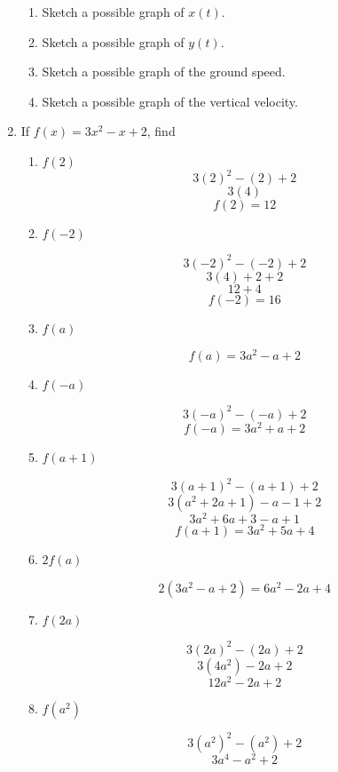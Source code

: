\documentclass{article}
\begin{document}
\begin{enumerate}
			\begin{enumerate}
				\item Sketch a possible graph of $x(t)$.
				
				\item Sketch a possible graph of $y(t)$.
				
				\item Sketch a possible graph of the ground speed.
				
				\item Sketch a possible graph of the vertical velocity.
			\end{enumerate}
			
		\item If $f(x) = 3x^2 - x + 2$, find 
			\begin{enumerate}
				\item $f(2)$
					$$3(2)^2 - (2) + 2$$
					$$3(4)$$
					$$f(2) = 12$$
					
				\item $f(-2)$
				
					$$3(-2)^2 - (-2) + 2$$
					$$3(4) + 2 + 2 $$
					$$12 + 4$$
					$$f(-2) = 16$$
					
				\item $f(a)$
				
					$$ f(a) = 3a^2 - a + 2 $$
				
				\item $f(-a)$
				
					$$3(-a)^2 - (- a) + 2$$
					$$f(-a) = 3a^2 + a + 2$$
					
				\item $f(a+ 1)$
				
					$$3(a + 1)^2 - (a + 1) + 2$$
					$$3(a^2 + 2a + 1) - a - 1 + 2 $$
					$$3a^2 + 6a + 3 - a + 1$$
					$$f(a+1) = 3a^2 +5a + 4$$
					
				\item $2f(a)$
				
					$$2 (3a^2 - a + 2) = 6a^2 - 2a + 4$$
					
				\item $f(2a)$
				
					$$3(2a)^2 - (2a) + 2$$
					$$3(4a^2) - 2a + 2$$
					$$12a^2 - 2a + 2$$
					
				\item $f(a^2)$
				
					$$3(a^2)^2 - (a^2) + 2$$
					$$3a^4 - a^2 + 2$$
			\end{enumerate}
	\end{enumerate}
\end{document}
